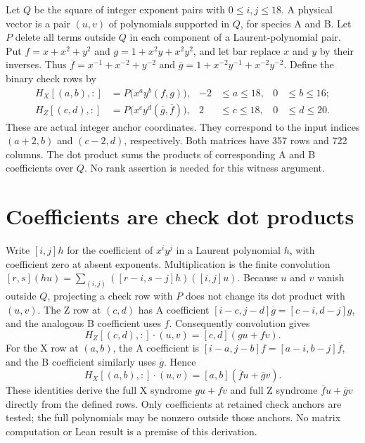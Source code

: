 \documentclass{article}
\begin{document}
Let \(Q\) be the square of integer exponent pairs with \(0 \le i,j \le 18\). A physical
vector is a pair \((u,v)\) of polynomials supported in \(Q\), for species A and B.
Let \(P\) delete all terms outside \(Q\) in each component of a Laurent-polynomial
pair. Put \(f = x + x^2 + y^2\) and \(g = 1 + x^2 y + x^2 y^2\), and let bar replace
\(x\) and \(y\) by their inverses. Thus \(\overline{f} = x^{-1} + x^{-2} + y^{-2}\) and
\(\overline{g} = 1 + x^{-2} y^{-1} + x^{-2} y^{-2}\). Define the binary check rows by
\begin{align}
  H_X[(a,b), {:}] &= P\bigl(x^a y^b (f, g)\bigr),
  & -2 &\le a \le 18, & 0 &\le b \le 16; \\
  H_Z[(c,d), {:}] &= P\bigl(x^c y^d (\overline{g}, \overline{f})\bigr),
  & 2 &\le c \le 18, & 0 &\le d \le 20.
\end{align}
These are actual integer anchor coordinates. They correspond to the input
indices \((a+2,b)\) and \((c-2,d)\), respectively. Both matrices have 357 rows and
722 columns. The dot product sums the products of corresponding A and B
coefficients over \(Q\). No rank assertion is needed for this witness argument.

\section{Coefficients are check dot products}\label{sec:coefficients}

Write \([i,j]h\) for the coefficient of \(x^i y^j\) in a Laurent polynomial \(h\),
with coefficient zero at absent exponents. Multiplication is the finite
convolution \([r,s](hu) = \sum_{(i,j)} ([r-i,s-j]h)([i,j]u)\).
Because \(u\) and \(v\) vanish outside \(Q\), projecting a check row with \(P\) does not
change its dot product with \((u,v)\). The Z row at \((c,d)\) has A coefficient
\([i-c,j-d]\overline{g} = [c-i,d-j]g\), and the analogous B coefficient uses \(f\).
Consequently convolution gives
\begin{equation}
  H_Z[(c,d), {:}] \cdot (u,v) = [c,d](gu + fv).
\end{equation}
For the X row at \((a,b)\), the A coefficient is \([i-a,j-b]f = [a-i,b-j]\overline{f}\),
and the B coefficient similarly uses \(\overline{g}\). Hence
\begin{equation}
  H_X[(a,b), {:}] \cdot (u,v) = [a,b](\overline{f} u + \overline{g} v).
\end{equation}
These identities derive the full X syndrome \(gu + fv\) and full Z syndrome
\(\overline{f} u + \overline{g} v\) directly from the defined rows. Only coefficients at
retained check anchors are tested; the full polynomials may be nonzero outside
those anchors. No matrix computation or Lean result is a premise of this derivation.
\end{document}
